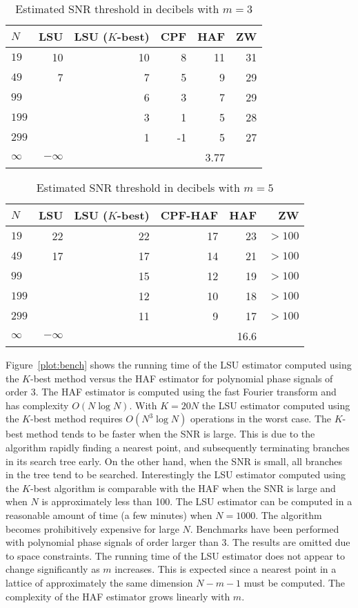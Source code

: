 \documentclass[journal]{IEEEtran}
\begin{document}
\begin{table}[t]
\centering
\begin{tabular}{lrrrrr}
$N$ & LSU & LSU ($K$-best) & CPF & HAF & ZW \\ \toprule
$19$ & 10 & 10 & 8 & 11 & 31 \\ 
$49$ & 7 & 7 & 5 & 9 & 29 \\ 
$99$ & & 6 & 3 & 7 & 29 \\ 
$199$ & & 3 & 1 & 5 & 28 \\ 
$299$ & & 1 & -1 & 5 & 27 \\ 
$\infty$ & $-\infty$ & & & 3.77 & \\ \bottomrule
\end{tabular}
\caption{Estimated SNR threshold in decibels with $m=3$}
\label{tablm3}
\end{table}

\begin{table}[t]
\centering
\begin{tabular}{lrrrrr}
$N$ & LSU & LSU ($K$-best) & CPF-HAF & HAF & ZW \\ \toprule
$19$ & 22  & 22 & 17 & 23 & $>100$ \\ 
$49$ & 17 & 17 & 14 & 21 & $>100$  \\ 
$99$ &  & 15 &  12 &  19 & $>100$ \\ 
$199$ & & 12 & 10 & 18 & $>100$ \\ 
$299$ &  & 11 & 9 & 17 & $>100$ \\ 
$\infty$ & $-\infty$ &  &  & 16.6 &  \\ \bottomrule
\end{tabular}
\caption{Estimated SNR threshold in decibels with $m=5$}
\label{tablm5}
\end{table}

Figure~\ref{plot:bench} shows the running time of the LSU estimator computed using the $K$-best method versus the HAF estimator for polynomial phase signals of order 3.  The HAF estimator is computed using the fast Fourier transform and has complexity $O(N \log N)$.   With $K=20N$ the LSU estimator computed using the $K$-best method requires $O(N^3 \log N)$ operations in the worst case.  The $K$-best method tends to be faster when the SNR is large.  This is due to the algorithm rapidly finding a nearest point, and subsequently terminating branches in its search tree early.  On the other hand, when the SNR is small, all branches in the tree tend to be searched.  Interestingly the LSU estimator computed using the $K$-best algorithm is comparable with the HAF when the SNR is large and when $N$ is approximately less than 100.  The LSU estimator can be computed in a reasonable amount of time (a few minutes) when $N=1000$.  The algorithm becomes prohibitively expensive for large $N$.  Benchmarks have been performed with polynomial phase signals of order larger than $3$.  The results are omitted due to space constraints.  The running time of the LSU estimator does not appear to change significantly as $m$ increases.  This is expected since a nearest point in a lattice of approximately the same dimension $N-m-1$ must be computed.  The complexity of the HAF estimator grows linearly with $m$.
\end{document}
